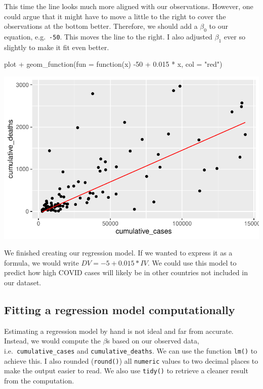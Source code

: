 \documentclass[
  letterpaper,
]{krantz}
\makeatletter
\newenvironment{Shaded}{\begin{snugshade}}{\end{snugshade}}
\newcommand{\AttributeTok}[1]{\textcolor[rgb]{0.40,0.45,0.13}{#1}}
\newcommand{\ControlFlowTok}[1]{\textcolor[rgb]{0.00,0.23,0.31}{#1}}
\newcommand{\DecValTok}[1]{\textcolor[rgb]{0.68,0.00,0.00}{#1}}
\newcommand{\FloatTok}[1]{\textcolor[rgb]{0.68,0.00,0.00}{#1}}
\newcommand{\FunctionTok}[1]{\textcolor[rgb]{0.28,0.35,0.67}{#1}}
\newcommand{\NormalTok}[1]{\textcolor[rgb]{0.00,0.23,0.31}{#1}}
\newcommand{\SpecialCharTok}[1]{\textcolor[rgb]{0.37,0.37,0.37}{#1}}
\newcommand{\StringTok}[1]{\textcolor[rgb]{0.13,0.47,0.30}{#1}}
\newenvironment{kframe}{%
\medskip{}
\setlength{\fboxsep}{.8em}
 \def\at@end@of@kframe{}%
 \ifinner\ifhmode%
  \def\at@end@of@kframe{\end{minipage}}%
  \begin{minipage}{\columnwidth}%
 \fi\fi%
 \def\FrameCommand##1{\hskip\@totalleftmargin \hskip-\fboxsep
 \colorbox{shadecolor}{##1}\hskip-\fboxsep
     \hskip-\linewidth \hskip-\@totalleftmargin \hskip\columnwidth}%
 \MakeFramed {\advance\hsize-\width
   \@totalleftmargin\z@ \linewidth\hsize
   \@setminipage}}%
 {\par\unskip\endMakeFramed%
 \at@end@of@kframe}
\renewenvironment{Shaded}{\begin{kframe}}{\end{kframe}}
\makeatother
\begin{document}
This time the line looks much more aligned with our observations.
However, one could argue that it might have to move a little to the
right to cover the observations at the bottom better. Therefore, we
should add a \(\beta_0\) to our equation, e.g.~\texttt{-50}. This moves
the line to the right. I also adjusted \(\beta_1\) ever so slightly to
make it fit even better.

\begin{Shaded}
\begin{Highlighting}[]
\NormalTok{plot }\SpecialCharTok{+}
  \FunctionTok{geom\_function}\NormalTok{(}\AttributeTok{fun =} \ControlFlowTok{function}\NormalTok{(x) }\SpecialCharTok{{-}}\DecValTok{50} \SpecialCharTok{+} \FloatTok{0.015} \SpecialCharTok{*}\NormalTok{ x, }\AttributeTok{col =} \StringTok{"red"}\NormalTok{)}
\end{Highlighting}
\end{Shaded}

\includegraphics{13_regressions_files/figure-pdf/fitting-model-by-hand-step-six-1.pdf}

We finished creating our regression model. If we wanted to express it as
a formula, we would write \(DV = -5 + 0.015 * IV\). We could use this
model to predict how high COVID cases will likely be in other countries
not included in our dataset.

\subsection{Fitting a regression model
computationally}\label{sec-fitting-a-regression-model-computationally}

Estimating a regression model by hand is not ideal and far from
accurate. Instead, we would compute the \(\beta\)s based on our observed
data, i.e.~\texttt{cumulative\_cases} and \texttt{cumulative\_deaths}.
We can use the function \texttt{lm()} to achieve this. I also rounded
(\texttt{round()}) all \texttt{numeric} values to two decimal places to
make the output easier to read. We also use \texttt{tidy()} to retrieve
a cleaner result from the computation.
\end{document}
